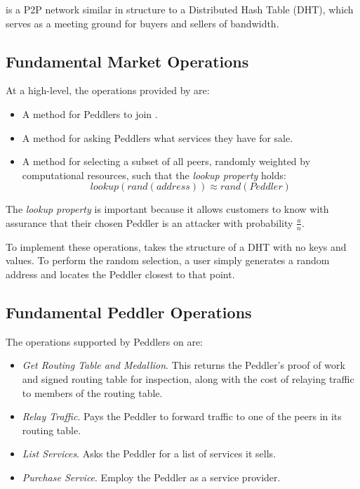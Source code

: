 
\TOM{} is a P2P network similar in structure to a Distributed Hash
Table (DHT), which serves as a meeting ground for buyers and sellers
of bandwidth.

\subsection{Fundamental Market Operations}
\label{fund-market}

At a high-level, the operations provided by \tOM{} are:

\begin{itemize}
\item A method for Peddlers to join \tOM{}.
\item A method for asking Peddlers what services they have for sale.
\item A method for selecting a subset of all peers, randomly weighted by computational resources, such that the \emph{lookup property} holds: $$lookup(rand(address)) \approx rand(Peddler)$$
\end{itemize}

The \emph{lookup property} is important because it allows customers to
know with assurance that their chosen Peddler is an attacker with
probability $\frac{a}{n}$.

To implement these operations, \tOM{} takes the structure of a DHT
with no keys and values. To perform the random selection, a user
simply generates a random address and locates the Peddler closest to
that point.

\subsection{Fundamental Peddler Operations}

The operations supported by Peddlers on \tOM{} are:

\begin{itemize}
\item \emph{Get Routing Table and Medallion}. This returns the Peddler's proof of work and signed routing table for inspection, along with the cost of relaying traffic to members of the routing table.
\item \emph{Relay Traffic}. Pays the Peddler to forward traffic to one of the peers in its routing table.
\item \emph{List Services}. Asks the Peddler for a list of services it sells.
\item \emph{Purchase Service}. Employ the Peddler as a service provider.
\end{itemize}

